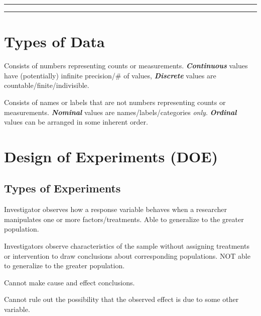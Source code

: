 \documentclass[]{article}
\newenvironment{definitions}{
	\begin{description}[font=\sffamily\bfseries, leftmargin=1cm, style=nextline]
	}{
	\end{description}
}
\begin{document}
	
	\tableofcontents
	\hspace{2em}
	\hrule
	\hrule
	
	\section{Types of Data}
	\begin{definitions}
		\item[Numeric/Quantitative]
		Consists of numbers representing counts or measurements. \textit{\textbf{Continuous}} values have (potentially) infinite precision/\# of values, \textit{\textbf{Discrete}} values are countable/finite/indivisible.
		\item[Categorical/Qualitative]
		Consists of names or labels that are not numbers representing counts or measurements. \textit{\textbf{Nominal}} values are names/labels/categories \textit{only}. \textit{\textbf{Ordinal}} values can be arranged in some inherent order.
	\end{definitions}
	
	\section{Design of Experiments (DOE)}
	\subsection{Types of Experiments}
	\begin{definitions}
		\item[Designed Experiment]
		Investigator observes how a response variable behaves when a researcher manipulates one or more factors/treatments. Able to generalize to the greater population.
		\item[Observational Study]
		Investigators observe characteristics of the sample without assigning treatments or intervention to draw conclusions about corresponding populations. NOT able to generalize to the greater population.
		\item[Causality]
		Cannot make cause and effect conclusions.
		\item[Confounding Factors]
		Cannot rule out the possibility that the observed effect is due to some other variable.
	\end{definitions}
\end{document}
